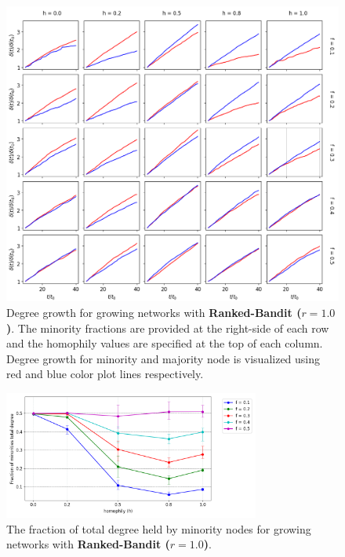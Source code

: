 \begin{figure}[h!]
	\centering
	\includegraphics[width=1.0\textwidth]{images/dg_growth_rb10.png}
	\caption{Degree growth for growing networks with \textbf{Ranked-Bandit ($r = 1.0$)}. The minority fractions are provided at the right-side of each row and the homophily values are specified at the top of each column. Degree growth for minority and majority node is visualized using red and blue color plot lines respectively.}
	\label{dg_growth_rb10_fig}
\end{figure}

\begin{figure}
	\centering
	\includegraphics[trim=0 5 0 10, clip, width=0.75\textwidth]{images/mf_growth_rb10.png}
	\caption{The fraction of total degree held by minority nodes for growing networks with \textbf{Ranked-Bandit ($r = 1.0$)}.}
	\label{mf_growth_rb10_fig}
\end{figure}

